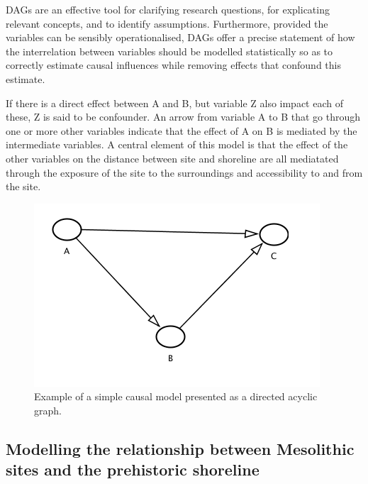 \documentclass[
  a4paper,
  oneside]{uiophdthesis}
\begin{document}
DAGs are an effective tool for clarifying research questions, for explicating relevant concepts, and to identify assumptions. Furthermore, provided the variables can be sensibly operationalised, DAGs offer a precise statement of how the interrelation between variables should be modelled statistically so as to correctly estimate causal influences while removing effects that confound this estimate.

If there is a direct effect between A and B, but variable Z also impact each of these, Z is said to be confounder. An arrow from variable A to B that go through one or more other variables indicate that the effect of A on B is mediated by the intermediate variables. A central element of this model is that the effect of the other variables on the distance between site and shoreline are all mediatated through the exposure of the site to the surroundings and accessibility to and from the site.

\begin{figure}

{\centering \includegraphics[width=1\linewidth]{figures/dag_ex} 

}

\caption{Example of a simple causal model presented as a directed acyclic graph.}\label{fig:dag}
\end{figure}

\hypertarget{modelling-the-relationship-between-mesolithic-sites-and-the-prehistoric-shoreline}{%
\subsection{Modelling the relationship between Mesolithic sites and the prehistoric shoreline}\label{modelling-the-relationship-between-mesolithic-sites-and-the-prehistoric-shoreline}}
\end{document}

